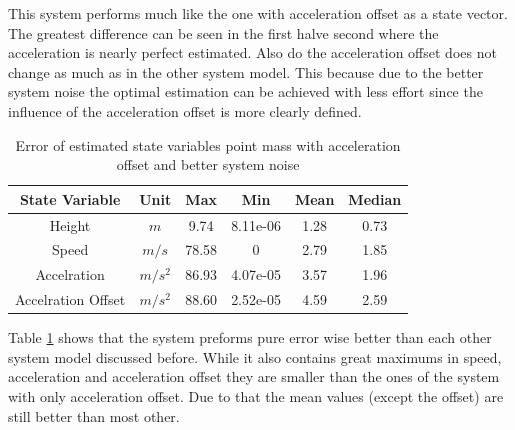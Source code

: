 This system performs much like the one with acceleration offset as a state vector.
The greatest difference can be seen in the first halve second where the acceleration is nearly perfect estimated.
Also do the acceleration offset does not change as much as in the other system model.
This because due to the better system noise the optimal estimation can be achieved with less effort since the influence of the acceleration offset is more clearly defined.

\begin{table}[h!]
\centering
\begin{tabular}{cccccc}
\hline
\multicolumn{1}{|c|}{State Variable} & \multicolumn{1}{c|}{Unit} & \multicolumn{1}{c|}{Max} & \multicolumn{1}{c|}{Min} & \multicolumn{1}{c|}{Mean} & \multicolumn{1}{c|}{Median} \\ \hline
Height                            & $m$                         & 9.74	                  & 8.11e-06                 & 1.28                    & 0.73                      \\
Speed                             & $m/s$                       & 78.58                   & 0                        & 2.79                    & 1.85                      \\
Accelration                       & $m/s^2$   			& 86.93                   & 4.07e-05                 & 3.57                    & 1.96                     \\
Accelration Offset                & $m/s^2$   			& 88.60                   & 2.52e-05                 & 4.59                    & 2.59                     
\end{tabular}
\caption{Error of estimated state variables point mass with acceleration offset and better system noise}
\label{tab:ErrorPointMassBetterNoise}
\end{table}

Table \ref{tab:ErrorPointMassBetterNoise} shows that the system preforms pure error wise better than each other system model discussed before.
While it also contains great maximums in speed, acceleration and acceleration offset they are smaller than the ones of the system with only acceleration offset.
Due to that the mean values (except the offset) are still better than most other.

